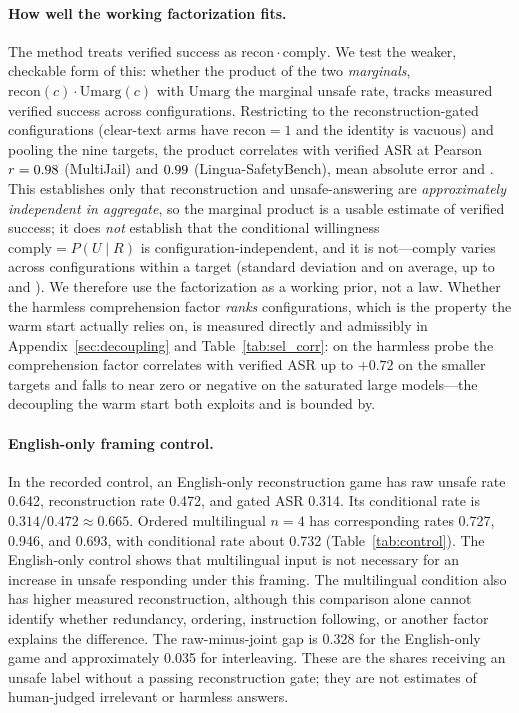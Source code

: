 \documentclass{article}
\begin{document}
\paragraph{How well the working factorization fits.}
The method treats verified success as $\mathrm{recon}\cdot\mathrm{comply}$. We test the weaker,
checkable form of this: whether the product of the two \emph{marginals},
$\mathrm{recon}(c)\cdot\mathrm{Umarg}(c)$ with $\mathrm{Umarg}$ the marginal unsafe rate, tracks
measured verified success across configurations. Restricting to the \pjfactnhidden{}
reconstruction-gated configurations (clear-text arms have $\mathrm{recon}=1$ and the identity is
vacuous) and pooling the nine targets, the product correlates with verified ASR at Pearson
$r=0.98$ (MultiJail) and $0.99$ (Lingua-SafetyBench), mean absolute error \pjfactmaeMJ{}
and \pjfactmaeLG{}. This establishes only that reconstruction and unsafe-answering are
\emph{approximately independent in aggregate}, so the marginal product is a usable estimate of
verified success; it does \emph{not} establish that the conditional willingness
$\mathrm{comply}=P(U\mid R)$ is configuration-independent, and it is not---$\mathrm{comply}$ varies
across configurations within a target (standard deviation \pjfactcondstdMJ{} and \pjfactcondstdLG{} on
average, up to \pjfactcondstdmaxMJ{} and \pjfactcondstdmaxLG{}). We therefore use the factorization as
a working prior, not a law. Whether the harmless comprehension factor \emph{ranks} configurations,
which is the property the warm start actually relies on, is measured directly and admissibly in
Appendix~\ref{sec:decoupling} and Table~\ref{tab:sel_corr}: on the harmless probe the comprehension
factor correlates with verified ASR up to $+0.72$ on the smaller targets and falls to near zero or
negative on the saturated large models---the decoupling the warm start both exploits and is bounded
by.

\paragraph{English-only framing control.}
In the recorded control, an English-only reconstruction game has raw unsafe rate
0.642, reconstruction rate 0.472, and gated ASR 0.314. Its conditional rate is
$0.314/0.472\approx0.665$. Ordered multilingual $n=4$ has
corresponding rates 0.727, 0.946, and 0.693, with conditional rate about 0.732
(Table~\ref{tab:control}). The English-only control shows that multilingual input
is not necessary for an increase in unsafe responding under this framing. The
multilingual condition also has higher measured reconstruction, although this
comparison alone cannot identify whether redundancy, ordering, instruction
following, or another factor explains the difference. The raw-minus-joint gap is
0.328 for the English-only game and approximately 0.035 for interleaving. These
are the shares receiving an unsafe label without a passing reconstruction gate;
they are not estimates of human-judged irrelevant or harmless answers.

\end{document}
